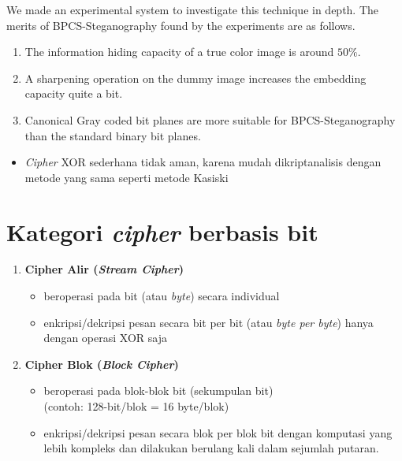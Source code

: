 \documentclass{article}
\begin{document}
We made an experimental system to investigate this technique in depth. The merits of BPCS-Steganography found by the experiments are as follows.

\begin{enumerate}
    \item The information hiding capacity of a true color image is around $50\%$.
    \item A sharpening operation on the dummy image increases the embedding capacity quite a bit.
    \item Canonical Gray coded bit planes are more suitable for BPCS-Steganography than the standard binary bit planes.
\end{enumerate}

\newpage


\begin{itemize}
  \item \textit{Cipher} XOR sederhana tidak aman, karena mudah dikriptanalisis dengan metode yang sama seperti metode Kasiski
\end{itemize}

\newpage


\section*{Kategori \textit{cipher} berbasis bit}

\begin{enumerate}
    \item \textbf{Cipher Alir (\textit{Stream Cipher})}
    \begin{itemize}
        \item beroperasi pada bit (atau \textit{byte}) secara individual
        \item enkripsi/dekripsi pesan secara bit per bit (atau \textit{byte per byte}) hanya dengan operasi XOR saja
    \end{itemize}
    
    \item \textbf{Cipher Blok (\textit{Block Cipher})}
    \begin{itemize}
        \item beroperasi pada blok-blok bit (sekumpulan bit) \\ (contoh: 128-bit/blok = 16 byte/blok)
        \item enkripsi/dekripsi pesan secara blok per blok bit dengan komputasi yang lebih kompleks dan dilakukan berulang kali dalam sejumlah putaran.
    \end{itemize}
\end{enumerate}
\end{document}
